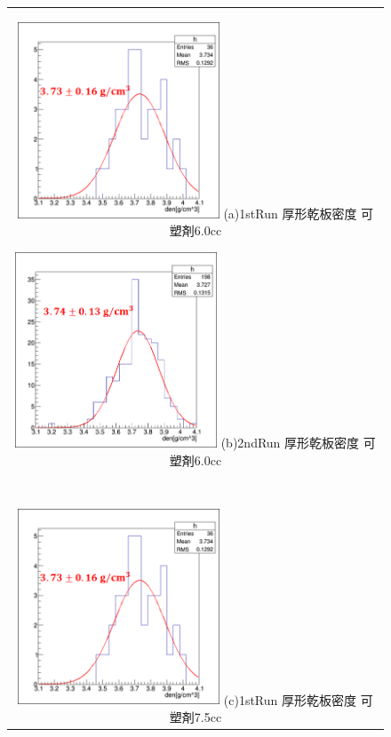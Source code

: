 \documentclass[12pt,a4paper]{jarticle}
\begin{document}
\begin{figure}[htbp]
  \centering
      \begin{tabular}{c}
        \begin{minipage}{0.5\hsize}
          \centering
            \includegraphics[clip, width=60mm]{1stRun_thin_den.png}
            \hspace{1.6cm} (a)1stRun 厚形乾板密度 可塑剤6.0cc
        \end{minipage}
        
        \begin{minipage}{0.5\hsize}
          \centering
            \includegraphics[clip, width=60mm]{2ndRun_thin_den.png}
            \hspace{1.6cm} (b)2ndRun 厚形乾板密度 可塑剤6.0cc
        \end{minipage}\\

	　\\
        \begin{minipage}{0.5\hsize}
          \centering
              \includegraphics[clip, width=60mm]{1stRun_thin_den.png}
              \hspace{1.6cm} (c)1stRun 厚形乾板密度 可塑剤7.5cc
          \end{minipage}
          

\end{tabular}
\end{figure}
\end{document}
